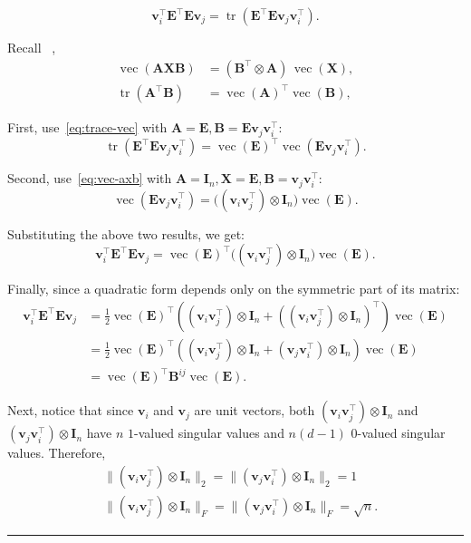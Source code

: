\documentclass{article}
\newcommand{\twonorm}[1]{\|#1\|_2}
\newcommand{\ts}{\top}
\newcommand{\vb}{\mathbf{v}}
\newcommand{\Ab}{\mathbf{A}}
\newcommand{\Bb}{\mathbf{B}}
\newcommand{\Eb}{\mathbf{E}}
\newcommand{\Ib}{\mathbf{I}}
\newcommand{\Xb}{\mathbf{X}}
\newcommand{\BlackBox}{\rule{1.5ex}{1.5ex}}  %
\newenvironment{proof}{\par\noindent{\bf Proof\ }}{\hfill\BlackBox\par\medskip}
\newcommand{\tr}{\mathop{\mathrm{tr}}}
\newcommand{\vect}{\mathop{\mathrm{vec}}}
\newcommand{\rbr}[1]{\left(#1\right)}
\newcommand{\norm}[1]{\|#1\|}
\begin{document}
\begin{proof}
\begin{equation}
    \vb_i^\ts \Eb^\ts \Eb \vb_j = \tr(\Eb^\ts \Eb \vb_j\vb_i^\ts).
\end{equation}

Recall ~\citep[Eqs.~(520)--(521)]{petersen2008matrix},
\begin{align}
    \vect(\Ab\Xb\Bb) &= (\Bb^\ts\otimes \Ab)\,\vect(\Xb), \label{eq:vec-axb}\\
    \tr(\Ab^\ts \Bb) &= \vect(\Ab)^\ts \vect(\Bb), \label{eq:trace-vec}
\end{align}

First, use~\eqref{eq:trace-vec} with $\Ab = \Eb, \Bb = \Eb \vb_j \vb_i^\ts$:
\begin{equation}
    \tr(\Eb^\ts \Eb \vb_j\vb_i^\ts) = \vect(\Eb)^\ts \vect( \Eb \vb_j \vb_i^\ts).
\end{equation}

Second, use~\eqref{eq:vec-axb} with $\Ab = \Ib_n, \Xb = \Eb, \Bb = \vb_j \vb_i^\ts$:
\begin{equation}
    \vect( \Eb \vb_j \vb_i^\ts) = \bigl((\vb_i\vb_j^\ts)\otimes\Ib_n\bigr)\vect(\Eb).
\end{equation}

Substituting the above two results, we get:
\begin{equation}
     \vb_i^\ts \Eb^\ts \Eb \vb_j =\vect(\Eb)^\ts \bigl((\vb_i\vb_j^\ts)\otimes\Ib_n\bigr)\vect(\Eb).
\end{equation}

Finally, since a quadratic form depends only on the symmetric part of its matrix:
\begin{align}
    \vb_i^\ts \Eb^\ts \Eb \vb_j &= \frac{1}{2}\vect(\Eb)^\ts \rbr{(\vb_i\vb_j^\ts)\otimes\Ib_n + \rbr{(\vb_i\vb_j^\ts)\otimes\Ib_n}^\ts}\vect(\Eb)\\
    &= \frac{1}{2}\vect(\Eb)^\ts \rbr{(\vb_i\vb_j^\ts)\otimes\Ib_n + (\vb_j\vb_i^\ts)\otimes\Ib_n}\vect(\Eb)\\
    &= \vect(\Eb)^\ts \Bb^{ij} \vect(\Eb).
\end{align}

Next, notice that since $\vb_i$ and $\vb_j$ are unit vectors, both $(\vb_i\vb_j^\ts)\otimes\Ib_n$ and $(\vb_j\vb_i^\ts)\otimes\Ib_n$ have $n$ $1$-valued singular values and $n(d-1)$ $0$-valued singular values. Therefore, 
\begin{align}
    &\twonorm{(\vb_i\vb_j^\ts)\otimes\Ib_n} = \twonorm{(\vb_j\vb_i^\ts)\otimes\Ib_n} =1 \\
    &\norm{(\vb_i\vb_j^\ts)\otimes\Ib_n}_F = \norm{(\vb_j\vb_i^\ts)\otimes\Ib_n}_F = \sqrt{n}.
\end{align}


\end{proof}
\end{document}
